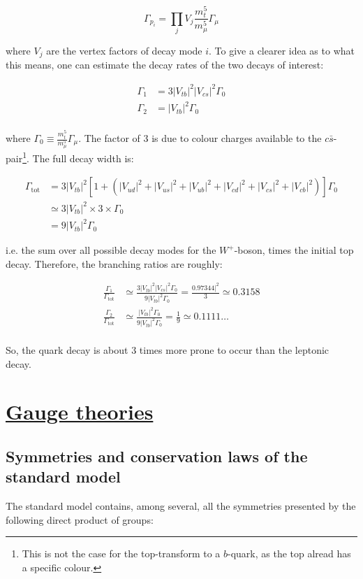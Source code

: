 \documentclass[11pt,a4paper]{article}
\begin{document}
\begin{equation}
	\Gamma_{p_i} = \prod_j V_j \frac{m_t^5}{m_\mu^5}\Gamma_\mu
\end{equation}

where $V_j$ are the vertex factors of decay mode $i$. To give a clearer idea as to what this means, one can estimate the decay rates of the two decays of interest:

\begin{align}
	\Gamma_1 &= 3|V_{tb}|^2|V_{cs}|^2\Gamma_0\\
	\Gamma_2 &= |V_{tb}|^2\Gamma_0\\
\end{align}

where $\Gamma_0 \equiv \frac{m_t^5}{m_\mu^5}\Gamma_\mu$. The factor of 3 is due to colour charges available to the $c\bar{s}$-pair\footnote{This is not the case for the top-transform to a $b$-quark, as the top alread has a specific colour.}. The full decay width is:

\begin{align}
	\Gamma_{\text{tot}} &= 3|V_{tb}|^2\left[1+\left(|V_{ud}|^2+|V_{us}|^2+|V_{ub}|^2+|V_{cd}|^2+|V_{cs}|^2+|V_{cb}|^2\right)\right]\Gamma_0\\
	 &\simeq 3|V_{tb}|^2\times 3\times\Gamma_0\\
	 &= 9|V_{tb}|^2\Gamma_0
\end{align}

i.e. the sum over all possible decay modes for the $W^+$-boson, times the initial top decay. Therefore, the branching ratios are roughly:

\begin{align*}
	\frac{\Gamma_1}{\Gamma_{\text{tot}}} &\simeq \frac{3|V_{tb}|^2|V_{cs}|^2\Gamma_0}{9|V_{tb}|^2\Gamma_0} = \frac{0.97344|^2}{3} \simeq 0.3158\\
	\frac{\Gamma_2}{\Gamma_{\text{tot}}} &\simeq \frac{|V_{tb}|^2\Gamma_0}{9|V_{tb}|^2\Gamma_0} = \frac{1}{9} \simeq 0.1111\ldots\\
\end{align*}

So, the quark decay is about 3 times more prone to occur than the leptonic decay.

\section{\underline{Gauge theories}}
\subsection{Symmetries and conservation laws of the standard model}
The standard model contains, among several, all the symmetries presented by the following direct product of groups:
\end{document}
